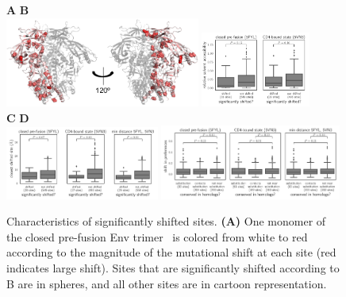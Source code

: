 \documentclass[9pt]{elife}
\begin{document}
\begin{figure}
{\bf \Large A} \hspace{0.6\textwidth} {\bf \Large B}  \\
\includegraphics[width=0.57\textwidth]{figures/shifts_on_structure/shifts_on_structure.pdf}
\hspace{0.06\textwidth}
\includegraphics[width=0.32\textwidth]{figures/rsa_vs_shifts.pdf}
\\
 {\bf \Large C} \hspace{0.45\textwidth} {\bf \Large D} \\
\includegraphics[width=0.45\textwidth]{figures/shifts_proximity.pdf}
\hspace{0.02\textwidth}
\includegraphics[width=0.53\textwidth]{figures/conservation_vs_shifts.pdf} 
\caption{\label{fig:shiftfeatures}
Characteristics of significantly shifted sites.
{\bf (A)} One monomer of the closed pre-fusion Env trimer~\citep[PDB 5FYL;][]{stewart2016trimeric} is colored from white to red according to the magnitude of the mutational shift at each site (red indicates large shift).
Sites that are significantly shifted according to B are in spheres, and all other sites are in cartoon representation.
}
\end{figure}
\end{document}
